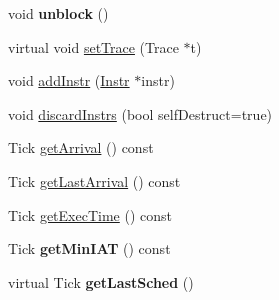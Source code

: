 \begin{DoxyCompactItemize}
\item 
void {\bfseries unblock} ()\hypertarget{classRTSim_1_1Task_a683d5d50c3f6b5dac76bb5a8b80f44a9}{}\label{classRTSim_1_1Task_a683d5d50c3f6b5dac76bb5a8b80f44a9}

\item 
virtual void \hyperlink{classRTSim_1_1Task_a8aa6d8ad5155e0b4e0cb37ed3e238cec}{set\+Trace} (Trace $\ast$t)
\item 
void \hyperlink{classRTSim_1_1Task_a7ce6f11c6157cb22ba089913a2991512}{add\+Instr} (\hyperlink{classRTSim_1_1Instr}{Instr} $\ast$instr)
\item 
void \hyperlink{classRTSim_1_1Task_a4cc696b080cf82e1008506c3410d39bb}{discard\+Instrs} (bool self\+Destruct=true)
\item 
Tick \hyperlink{classRTSim_1_1Task_a7b2d2aa8e133ebbafba2d80e8c7b6441}{get\+Arrival} () const 
\item 
Tick \hyperlink{classRTSim_1_1Task_aa4720d1ca0cc2096d258bebd7429d23a}{get\+Last\+Arrival} () const 
\item 
Tick \hyperlink{classRTSim_1_1Task_a462029660376afbc004f6c92d7c34127}{get\+Exec\+Time} () const 
\item 
Tick {\bfseries get\+Min\+I\+AT} () const \hypertarget{classRTSim_1_1Task_ac922c04e67ea70b6f2381a0ad81a512e}{}\label{classRTSim_1_1Task_ac922c04e67ea70b6f2381a0ad81a512e}

\item 
virtual Tick {\bfseries get\+Last\+Sched} ()\hypertarget{classRTSim_1_1Task_a070f2b38edff561bf7e513e8766eaa51}{}\label{classRTSim_1_1Task_a070f2b38edff561bf7e513e8766eaa51}


\end{DoxyCompactItemize}
